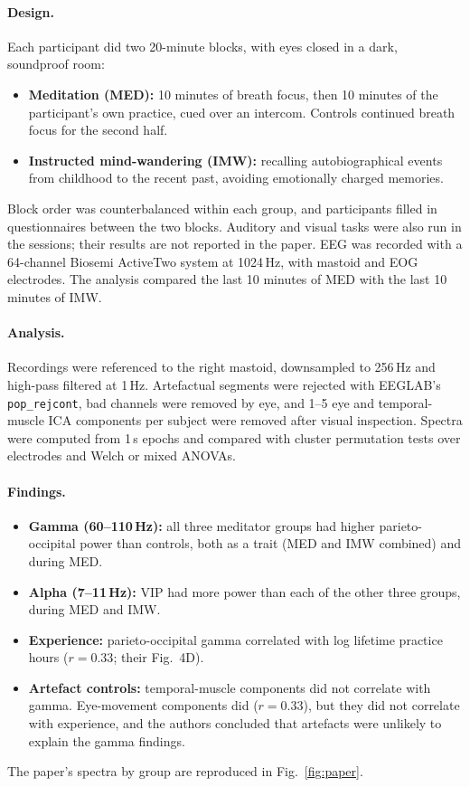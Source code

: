 \documentclass[10pt,a4paper]{article}
\begin{document}
\paragraph{Design.} Each participant did two 20-minute blocks, with eyes closed in a dark, soundproof room:
\begin{itemize}
  \item \textbf{Meditation (MED):} 10 minutes of breath focus, then 10 minutes of the participant's own practice,
        cued over an intercom. Controls continued breath focus for the second half.
  \item \textbf{Instructed mind-wandering (IMW):} recalling autobiographical events from childhood to the recent
        past, avoiding emotionally charged memories.
\end{itemize}
Block order was counterbalanced within each group, and participants filled in questionnaires between the two blocks.
Auditory and visual tasks were also run in the sessions; their results are not reported in the paper.
EEG was recorded with a 64-channel Biosemi ActiveTwo system at 1024\,Hz, with mastoid and EOG electrodes.
The analysis compared the last 10 minutes of MED with the last 10 minutes of IMW.

\paragraph{Analysis.} Recordings were referenced to the right mastoid, downsampled to 256\,Hz and high-pass filtered
at 1\,Hz. Artefactual segments were rejected with EEGLAB's \texttt{pop\_rejcont}, bad channels were removed by
eye, and 1--5 eye and temporal-muscle ICA components per subject were removed after visual inspection. Spectra were
computed from 1\,s epochs and compared with cluster permutation tests over electrodes and Welch or mixed ANOVAs.

\paragraph{Findings.}
\begin{itemize}
  \item \textbf{Gamma (60--110\,Hz):} all three meditator groups had higher parieto-occipital power than controls,
        both as a trait (MED and IMW combined) and during MED.
  \item \textbf{Alpha (7--11\,Hz):} VIP had more power than each of the other three groups, during MED and IMW.
  \item \textbf{Experience:} parieto-occipital gamma correlated with log lifetime practice hours ($r=0.33$; their Fig.~4D).
  \item \textbf{Artefact controls:} temporal-muscle components did not correlate with gamma. Eye-movement
        components did ($r=0.33$), but they did not correlate with experience, and the authors concluded that
        artefacts were unlikely to explain the gamma findings.
\end{itemize}
The paper's spectra by group are reproduced in Fig.~\ref{fig:paper}.
\end{document}

